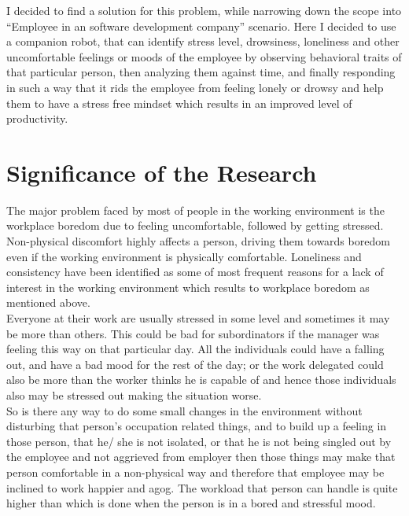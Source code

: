 \documentclass{article}
\begin{document}
	\indent I decided to find a solution for this problem, while narrowing down the scope into “Employee in an software development company” scenario. Here I decided to use a companion robot, that can identify stress level, drowsiness, loneliness and other uncomfortable feelings or moods of the employee by observing behavioral traits of that particular person, then analyzing them against time, and finally responding in such a way that it rids the employee from feeling lonely or drowsy and help them to have a stress free mindset which results in an improved level of productivity.
	
	\section{Significance of the Research}
	The major problem faced by most of people in the working environment is the workplace boredom due to feeling uncomfortable, followed by getting stressed. Non-physical discomfort highly affects a person, driving them towards boredom\cite{whyYouFeelBored} even if the working environment is physically comfortable. Loneliness and consistency have been identified as some of most frequent reasons for a lack of interest in the working environment which results to workplace boredom as mentioned above.\\ 
	
	\indent Everyone at their work are usually stressed in some level and sometimes it may be more than others. This could be bad for subordinators if the manager was feeling this way on that particular day. All the individuals could have a falling out, and have a bad mood for the rest of the day; or the work delegated could also be more than the worker thinks he is capable of and hence those individuals also may be stressed out making the situation worse.\\

	\indent So is there any way to do some small changes in the environment without disturbing that person's occupation related things, and to build up a feeling in those person, that he/ she is not isolated, or that he is not being singled out by the employee and not aggrieved from employer then those things may make that person comfortable in a non-physical way and therefore that employee may be inclined to work happier and agog\cite{happynessAndProductivity}. The workload that person can handle is quite higher than which is done when the person is in a bored and stressful mood.\\
	
\end{document}
